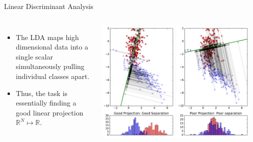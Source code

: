 \documentclass[10pt, aspectratio=169]{beamer} %
\newcommand{\R}{{\mathbb{R}}}
\begin{document}
\begin{frame}{Linear Discriminant Analysis}
\begin{columns}
\begin{itemize}
\item The LDA maps high dimensional data into a single scalar simultaneously pulling individual
classes apart.
\item Thus, the task is essentially finding a good linear projection $\R^N \mapsto \R$.
\end{itemize}
\begin{center}
\includegraphics[width=0.47\textwidth]{LDA_proj1.pdf}
\includegraphics[width=0.47\textwidth]{LDA_proj2.pdf}
\end{center}
\end{columns}
\end{frame}
\end{document}
